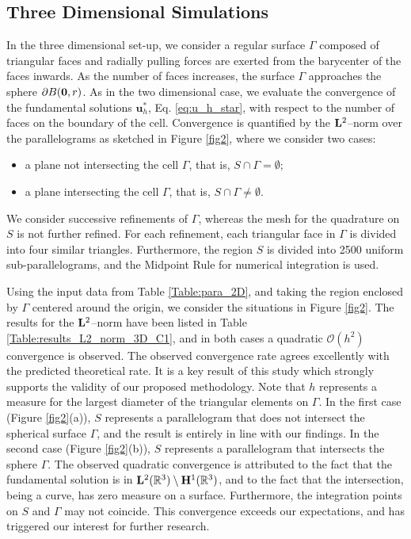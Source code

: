 \documentclass[pdflatex,sn-mathphys-num]{sn-jnl}
\newtheorem*{lemma star}{Lemma}
\begin{document}
\subsection{Three Dimensional Simulations}
In the three dimensional set-up, we consider a regular surface $\Gamma$ composed of triangular faces and radially pulling forces are exerted from the barycenter of the faces inwards. As the number of faces increases, the surface $\Gamma$ approaches the sphere $\partial B({\bf 0},r)$. As in the two dimensional case, we evaluate the convergence of the fundamental solutions ${\boldsymbol u}_h^{\ast}$, Eq. \eqref{eq:u_h_star}, with respect to the number of faces on the boundary of the cell. Convergence is quantified by the ${\bf L}^2$--norm over the parallelograms as sketched in Figure \ref{fig2}, where we consider two cases: 
\begin{itemize}
    \item[-] 
a plane not intersecting the cell $\Gamma$, that is, $S \cap \Gamma = \emptyset$;
\item[-] a plane intersecting the cell $\Gamma$, that is, $S \cap \Gamma \ne \emptyset$. 
\end{itemize}
We consider successive refinements of $\Gamma$, whereas the mesh for the quadrature on $S$ is not further refined. For each refinement, each triangular face in $\Gamma$ is divided into four similar triangles.
Furthermore, the region $S$ is divided into 2500 uniform sub-parallelograms, and the Midpoint Rule for numerical integration is used.

Using the input data from Table \ref{Table:para_2D}, and taking the region enclosed by $\Gamma$ centered around the origin, we consider the situations in Figure \ref{fig2}. The results for the ${\bf L}^2$--norm have been listed in Table \ref{Table:results_L2_norm_3D_C1}, and in both cases a quadratic $\mathcal{O}(h^2)$ convergence is observed. The observed convergence rate agrees excellently with the predicted theoretical rate. It is a key result of this study which strongly supports the validity of our proposed methodology.
Note that $h$ represents a measure for the largest diameter of the triangular elements on $\Gamma$.
In the first case (Figure \ref{fig2}(a)), $S$ represents a parallelogram that does not intersect the spherical surface $\Gamma$, and the result is entirely in line with our findings. In the second case (Figure \ref{fig2}(b)), $S$ represents a parallelogram that intersects the sphere $\Gamma$. The observed quadratic convergence is attributed to the fact that the fundamental solution is in ${\bf L}^2(\mathbb{R}^3) \setminus {\bf H}^1(\mathbb{R}^3)$, and to the fact that the intersection, being a curve, has zero measure on a surface. Furthermore, the integration points on $S$ and $\Gamma$ may not coincide. This convergence exceeds our expectations, and has triggered our interest for further research. 
\end{document}
